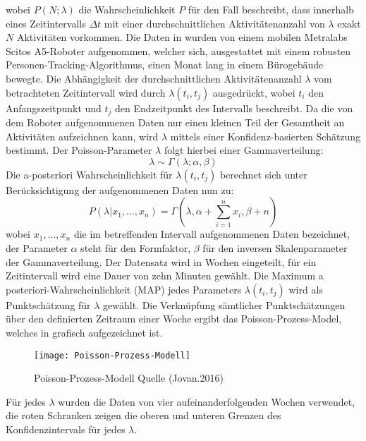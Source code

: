 wobei $P(N;\lambda)$ die Wahrscheinlichkeit $P$ für den Fall beschreibt, dass innerhalb eines Zeitintervalls $\Delta t$ mit einer durchschnittlichen Aktivitätenanzahl von $\lambda$ exakt $N$ Aktivitäten vorkommen. Die Daten in \cite{Jovan.2016} wurden von einem mobilen Metralabs Scitos A5-Roboter aufgenommen, welcher sich, ausgestattet mit einem robusten Personen-Tracking-Algorithmus, einen Monat lang in einem Bürogebäude bewegte. Die Abhängigkeit der durchschnittlichen Aktivitätenanzahl $\lambda$ vom betrachteten Zeitintervall wird durch $\lambda (t_i, t_j)$ ausgedrückt, wobei  $t_i$ den Anfangszeitpunkt und $t_j$ den Endzeitpunkt des Intervalls beschreibt. Da die von dem Roboter aufgenommenen Daten nur einen kleinen Teil der Gesamtheit an Aktivitäten aufzeichnen kann, wird $\lambda$ mittels einer Konfidenz-basierten Schätzung bestimmt. Der Poisson-Parameter $\lambda$ folgt hierbei einer Gammaverteilung:
\begin{equation}
	\lambda \sim \Gamma(\lambda ; \alpha, \beta)
\end{equation}
Die a-posteriori Wahrscheinlichkeit für $\lambda (t_i, t_j)$ berechnet sich unter Berücksichtigung der aufgenommenen Daten nun zu:
\begin{equation}
	P(\lambda | x_1, \dots, x_n) = \Gamma(\lambda, \alpha + \sum_{i=1}^{n} x_i, \beta +n)
\end{equation}
wobei $x_1, \dots , x_n$ die im betreffenden Intervall aufgenommenen Daten bezeichnet, der Parameter $\alpha$ steht für den Formfaktor, $\beta$ für den inversen Skalenparameter der Gammaverteilung.
Der Datensatz wird in Wochen eingeteilt, für ein Zeitintervall wird eine Dauer von zehn Minuten gewählt. Die Maximum a posteriori-Wahrscheinlichkeit (MAP) jedes Parameters $\lambda(t_i, t_j)$ wird als Punktschätzung für $\lambda$ gewählt. Die Verknüpfung sämtlicher Punktschätzungen über den definierten Zeitraum einer Woche ergibt das Poisson-Prozess-Model, welches in  grafisch aufgezeichnet ist. 
\begin{figure}[!ht]
	\begin{center}
		\texttt{[image: Poisson-Prozess-Modell]}
		\caption{Poisson-Prozess-Modell Quelle (Jovan.2016)}
		\label{fig.Poisson-Prozess-Modell}
	\end{center}
\end{figure}
Für jedes $\lambda$ wurden die Daten von vier aufeinanderfolgenden Wochen verwendet, die roten Schranken zeigen die oberen und unteren Grenzen des Konfidenzintervals für jedes $\lambda$. \\

